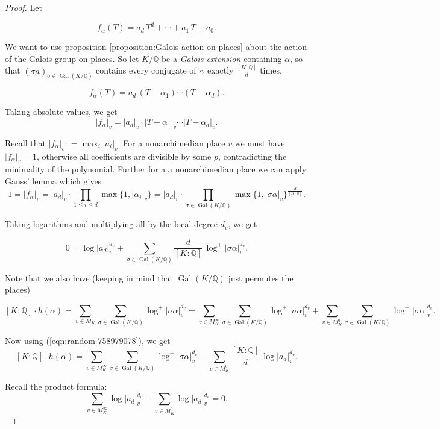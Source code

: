 \documentclass{article}
\newcommand{\refref}[2]{\hyperref[#2]{#1 \ref*{#2}}}
\newcommand{\eqnref}[1]{\hyperref[#1]{(\ref*{#1})}}
\theoremstyle{definition}
\DeclareMathOperator{\Gal}{Gal}
\newcommand{\dfn}{\mathrel{\mathop:}=}
\newcommand{\QQ}{\mathbb{Q}}
\begin{document}
\begin{proof}
  Let

  \[ f_\alpha (T) = a_d \, T^d + \cdots + a_1\,T + a_0. \]

  We want to use \refref{proposition}{proposition:Galois-action-on-places} about
  the action of the Galois group on places. So let $K/\QQ$ be a
  \emph{Galois extension} containing $\alpha$, so that
  $(\sigma a)_{\sigma\in \Gal (K/\QQ)}$ contains every conjugate of $\alpha$
  exactly $\frac{[K : \QQ]}{d}$ times.

  \[ f_\alpha (T) = a_d \, (T - \alpha_1) \cdots (T - \alpha_d). \]

  Taking absolute values, we get
  $$|f_\alpha|_v = |a_d|_v \cdot |T - \alpha_1|_v \cdots |T - \alpha_d|_v.$$

  Recall that $|f_\alpha|_v \dfn \max_i |a_i|_v$. For a nonarchimedian place $v$
  we must have $|f_\alpha|_v = 1$, otherwise all coefficients are divisible by
  some $p$, contradicting the minimality of the polynomial. Further for a a
  nonarchimedian place we can apply Gauss' lemma which gives
  \[ 1 = |f_\alpha|_v =
    |a_d|_v \cdot \prod_{1 \le i \le d} \max \{ 1, |\alpha_i|_v \} =
    |a_d|_v \cdot \prod_{\sigma \in \Gal (K/\QQ)} \max \{ 1, |\sigma \alpha|_v \}^{\frac{d}{[K : \QQ]}}. \]

  Taking logarithms and multiplying all by the local degree $d_v$, we get

  \begin{equation}
    \label{eqn:random-758979078} 0 = \log |a_d|_v^{d_v} + \sum_{\sigma \in \Gal (K/\QQ)} \frac{d}{[K : \QQ]} \, \log^+ |\sigma \alpha|_v^{d_v}.
  \end{equation}

  Note that we also have (keeping in mind that $\Gal (K/\QQ)$ just permutes the places)

  \[ [K : \QQ] \cdot h (\alpha) =
    \sum_{v \in M_K} \sum_{\sigma \in \Gal (K/\QQ)} \log^+ |\sigma \alpha|_v^{d_v} =
    \sum_{v \in M_K^\infty} \sum_{\sigma \in \Gal (K/\QQ)} \log^+ |\sigma \alpha|_v^{d_v} +
    \sum_{v \in M_K^0} \sum_{\sigma \in \Gal (K/\QQ)} \log^+ |\sigma \alpha|_v^{d_v}. \]

  Now using \eqnref{eqn:random-758979078}, we get
  \[ [K : \QQ] \cdot h (\alpha) =
    \sum_{v \in M_K^\infty} \sum_{\sigma \in \Gal (K/\QQ)} \log^+ |\sigma \alpha|_v^{d_v} -
    \sum_{v\in M_K^0} \frac{[K : \QQ]}{d} \, \log |a_d|_v^{d_v}. \]

  Recall the product formula:
  $$\sum_{v \in M_K^\infty} \log |a_d|_v^{d_v} + \sum_{v\in M_K^0} \log |a_d|_v^{d_v} = 0.$$


\end{proof}
\end{document}
